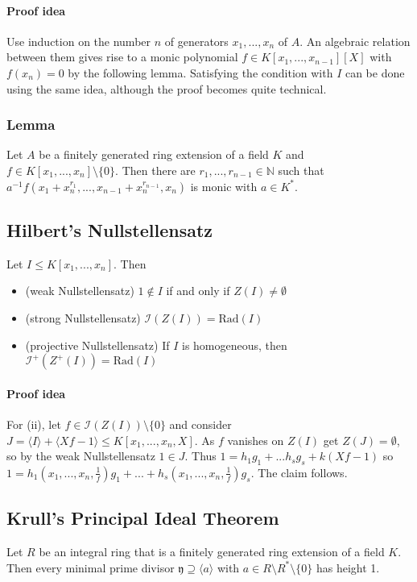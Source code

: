 \documentclass{scrartcl}
\newcommand{\N}{\mathbb{N}}
\begin{document}
\paragraph{Proof idea} Use induction on the number $n$ of generators $x_1, ..., x_n$ of $A$. 
An algebraic relation between them gives rise to a monic polynomial $f \in K[x_1, ..., x_{n - 1}][X]$ with $f(x_n) = 0$ by the following lemma.
Satisfying the condition with $I$ can be done using the same idea, although the proof becomes quite technical.

\subsubsection{Lemma}
Let $A$ be a finitely generated ring extension of a field $K$ and $f \in K[x_1, ..., x_n] \setminus \{0\}$.
Then there are $r_1, ..., r_{n - 1} \in \N$ such that $a^{-1}f(x_1 + x_n^{r_1}, ..., x_{n - 1} + x_n^{r_{n - 1}}, x_n)$ is monic with $a \in K^*$.

\subsection{Hilbert's Nullstellensatz}
Let $I \leq K[x_1, ..., x_n]$. Then
\begin{itemize}
    \item (weak Nullstellensatz) $1 \notin I$ if and only if $Z(I) \neq \emptyset$
    \item (strong Nullstellensatz) $\mathcal{I}(Z(I)) = \mathrm{Rad}(I)$
    \item (projective Nullstellensatz) If $I$ is homogeneous, then $\mathcal{I}^+(Z^+(I)) = \mathrm{Rad}(I)$
\end{itemize}
\paragraph{Proof idea} For (ii), let $f \in \mathcal{I}(Z(I)) \setminus \{0\}$ and consider $J = \langle I \rangle + \langle Xf - 1 \rangle \leq K[x_1, ..., x_n, X]$.
As $f$ vanishes on $Z(I)$ get $Z(J) = \emptyset$, so by the weak Nullstellensatz $1 \in J$.
Thus $1 = h_1 g_1 + ... h_s g_s + k(Xf - 1)$ so $1 = h_1(x_1, ..., x_n, \frac 1 f) g_1 + ... + h_s(x_1, ..., x_n, \frac 1 f) g_s$.
The claim follows.

\subsection{Krull's Principal Ideal Theorem}
\label{krulls_pit}
Let $R$ be an integral ring that is a finitely generated ring extension of a field $K$.
Then every minimal prime divisor $\mathfrak{y} \supseteq \langle a \rangle$ with $a \in R \setminus R^* \setminus \{ 0 \}$ has height 1.
\end{document}

